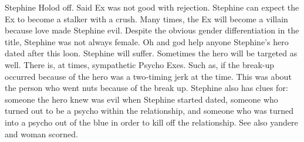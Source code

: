 \documentclass[12pt]{book}
\begin{document}
Stephine Holod off. Said Ex was not good with rejection. Stephine can expect the Ex to become a stalker with a crush. Many times, the Ex will become a villain because love made Stephine evil. Despite the obvious gender differentiation in the title, Stephine was not always female. Oh and god help anyone Stephine's hero dated after this loon. Stephine will suffer. Sometimes the hero will be targeted as well. There is, at times, sympathetic Psycho Exes. Such as, if the break-up occurred because of the hero was a two-timing jerk at the time. This was about the person who went nuts because of the break up. Stephine also has clues for: someone the hero knew was evil when Stephine started dated, someone who turned out to be a psycho within the relationship, and someone who was turned into a psycho out of the blue in order to kill off the relationship. See also yandere and woman scorned.
\end{document}
